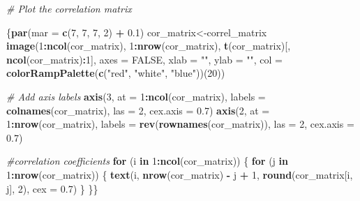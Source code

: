 \documentclass[
]{article}
\newenvironment{Shaded}{\begin{snugshade}}{\end{snugshade}}
\newcommand{\AttributeTok}[1]{\textcolor[rgb]{0.13,0.29,0.53}{#1}}
\newcommand{\CommentTok}[1]{\textcolor[rgb]{0.56,0.35,0.01}{\textit{#1}}}
\newcommand{\ConstantTok}[1]{\textcolor[rgb]{0.56,0.35,0.01}{#1}}
\newcommand{\ControlFlowTok}[1]{\textcolor[rgb]{0.13,0.29,0.53}{\textbf{#1}}}
\newcommand{\DecValTok}[1]{\textcolor[rgb]{0.00,0.00,0.81}{#1}}
\newcommand{\FloatTok}[1]{\textcolor[rgb]{0.00,0.00,0.81}{#1}}
\newcommand{\FunctionTok}[1]{\textcolor[rgb]{0.13,0.29,0.53}{\textbf{#1}}}
\newcommand{\NormalTok}[1]{#1}
\newcommand{\OtherTok}[1]{\textcolor[rgb]{0.56,0.35,0.01}{#1}}
\newcommand{\SpecialCharTok}[1]{\textcolor[rgb]{0.81,0.36,0.00}{\textbf{#1}}}
\newcommand{\StringTok}[1]{\textcolor[rgb]{0.31,0.60,0.02}{#1}}
\begin{document}
\begin{Shaded}
\begin{Highlighting}[]
\CommentTok{\# Plot the correlation matrix }

\NormalTok{\{}\FunctionTok{par}\NormalTok{(}\AttributeTok{mar =} \FunctionTok{c}\NormalTok{(}\DecValTok{7}\NormalTok{, }\DecValTok{7}\NormalTok{, }\DecValTok{7}\NormalTok{, }\DecValTok{2}\NormalTok{) }\SpecialCharTok{+} \FloatTok{0.1}\NormalTok{)}
\NormalTok{cor\_matrix}\OtherTok{\textless{}{-}}\NormalTok{correl\_matrix}
\FunctionTok{image}\NormalTok{(}\DecValTok{1}\SpecialCharTok{:}\FunctionTok{ncol}\NormalTok{(cor\_matrix), }\DecValTok{1}\SpecialCharTok{:}\FunctionTok{nrow}\NormalTok{(cor\_matrix), }\FunctionTok{t}\NormalTok{(cor\_matrix)[, }\FunctionTok{ncol}\NormalTok{(cor\_matrix)}\SpecialCharTok{:}\DecValTok{1}\NormalTok{], }
      \AttributeTok{axes =} \ConstantTok{FALSE}\NormalTok{, }\AttributeTok{xlab =} \StringTok{""}\NormalTok{, }\AttributeTok{ylab =} \StringTok{""}\NormalTok{, }\AttributeTok{col =} \FunctionTok{colorRampPalette}\NormalTok{(}\FunctionTok{c}\NormalTok{(}\StringTok{"red"}\NormalTok{, }\StringTok{"white"}\NormalTok{, }\StringTok{"blue"}\NormalTok{))(}\DecValTok{20}\NormalTok{))}

\CommentTok{\# Add axis labels }
\FunctionTok{axis}\NormalTok{(}\DecValTok{3}\NormalTok{, }\AttributeTok{at =} \DecValTok{1}\SpecialCharTok{:}\FunctionTok{ncol}\NormalTok{(cor\_matrix), }\AttributeTok{labels =} \FunctionTok{colnames}\NormalTok{(cor\_matrix), }\AttributeTok{las =} \DecValTok{2}\NormalTok{, }\AttributeTok{cex.axis =} \FloatTok{0.7}\NormalTok{)}
\FunctionTok{axis}\NormalTok{(}\DecValTok{2}\NormalTok{, }\AttributeTok{at =} \DecValTok{1}\SpecialCharTok{:}\FunctionTok{nrow}\NormalTok{(cor\_matrix), }\AttributeTok{labels =} \FunctionTok{rev}\NormalTok{(}\FunctionTok{rownames}\NormalTok{(cor\_matrix)), }\AttributeTok{las =} \DecValTok{2}\NormalTok{, }\AttributeTok{cex.axis =} \FloatTok{0.7}\NormalTok{)}

\CommentTok{\#correlation coefficients}
\ControlFlowTok{for}\NormalTok{ (i }\ControlFlowTok{in} \DecValTok{1}\SpecialCharTok{:}\FunctionTok{ncol}\NormalTok{(cor\_matrix)) \{}
  \ControlFlowTok{for}\NormalTok{ (j }\ControlFlowTok{in} \DecValTok{1}\SpecialCharTok{:}\FunctionTok{nrow}\NormalTok{(cor\_matrix)) \{}
    \FunctionTok{text}\NormalTok{(i, }\FunctionTok{nrow}\NormalTok{(cor\_matrix) }\SpecialCharTok{{-}}\NormalTok{ j }\SpecialCharTok{+} \DecValTok{1}\NormalTok{, }\FunctionTok{round}\NormalTok{(cor\_matrix[i, j], }\DecValTok{2}\NormalTok{), }\AttributeTok{cex =} \FloatTok{0.7}\NormalTok{)}
\NormalTok{  \}}
\NormalTok{\}\}}
\end{Highlighting}
\end{Shaded}
\end{document}
